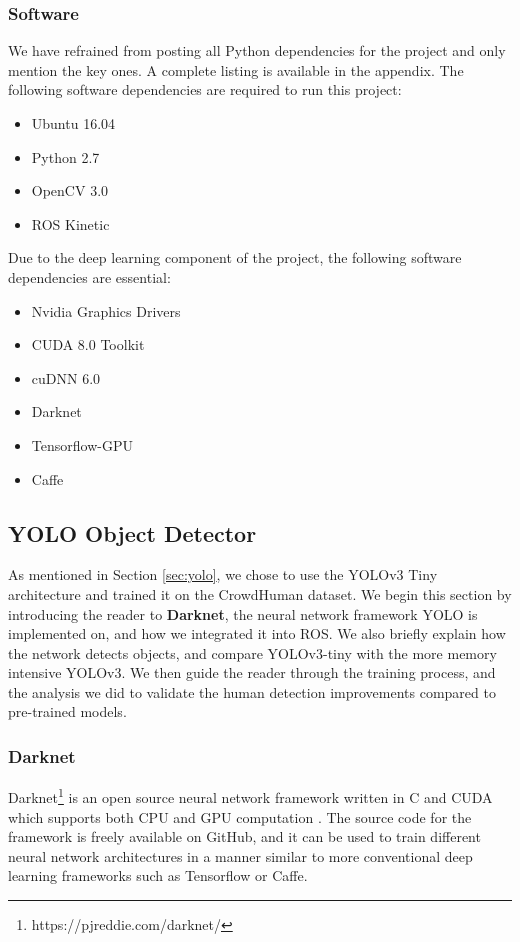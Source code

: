 \subsubsection{Software}
We have refrained from posting all Python dependencies for the project and only mention the key ones. A complete listing is available in the appendix. The following software dependencies are required to run this project:
\begin{itemize}
	\item Ubuntu 16.04
	\item Python 2.7
	\item OpenCV 3.0
	\item ROS Kinetic
\end{itemize}

Due to the deep learning component of the project, the following software dependencies are essential:
\begin{itemize}
	\item Nvidia Graphics Drivers 
	\item CUDA 8.0 Toolkit
	\item cuDNN 6.0
	\item Darknet
	\item Tensorflow-GPU
	\item Caffe
\end{itemize}

\subsection{YOLO Object Detector}
As mentioned in Section \ref{sec:yolo}, we chose to use the YOLOv3 Tiny architecture and trained it on the CrowdHuman dataset. We begin this section by introducing the reader to \textbf{Darknet}, the neural network framework YOLO is implemented on, and how we integrated it into ROS. We also briefly explain how the network detects objects, and compare YOLOv3-tiny with the more memory intensive YOLOv3. We then guide the reader through the training process, and the analysis we did to validate the human detection improvements compared to pre-trained models.

\subsubsection{Darknet}
Darknet\footnote{https://pjreddie.com/darknet/} is an open source neural network framework written in C and CUDA which supports both CPU and GPU computation \cite{darknet13}. The source code for the framework is freely available on GitHub, and it can be used to train different neural network architectures in a manner similar to more conventional deep learning frameworks such as Tensorflow or Caffe.

